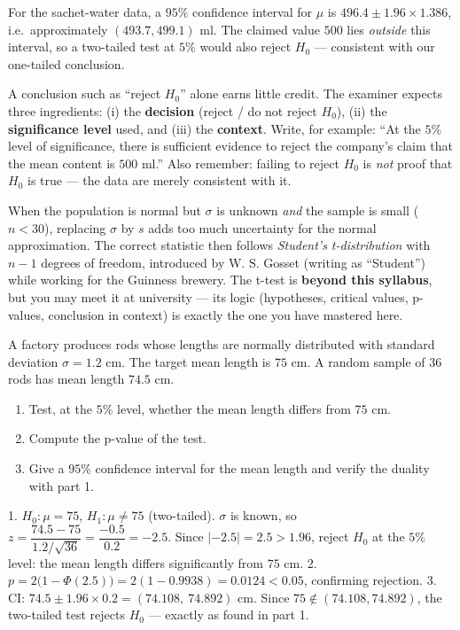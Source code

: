 \documentclass[11pt]{article}
\begin{document}
For the sachet-water data, a $95\%$ confidence interval for $\mu$ is $496.4 \pm 1.96 \times 1.386$, i.e.\ approximately $(493.7, 499.1)$ ml. The claimed value $500$ lies \emph{outside} this interval, so a two-tailed test at $5\%$ would also reject $H_0$ — consistent with our one-tailed conclusion.

\begin{attention}
A conclusion such as ``reject $H_0$'' alone earns little credit. The examiner expects three ingredients: (i) the \textbf{decision} (reject / do not reject $H_0$), (ii) the \textbf{significance level} used, and (iii) the \textbf{context}. Write, for example: ``At the $5\%$ level of significance, there is sufficient evidence to reject the company's claim that the mean content is $500$ ml.'' Also remember: failing to reject $H_0$ is \emph{not} proof that $H_0$ is true — the data are merely consistent with it.
\end{attention}

\begin{savaistu}
When the population is normal but $\sigma$ is unknown \emph{and} the sample is small ($n < 30$), replacing $\sigma$ by $s$ adds too much uncertainty for the normal approximation. The correct statistic then follows \emph{Student's t-distribution} with $n - 1$ degrees of freedom, introduced by W. S. Gosset (writing as ``Student'') while working for the Guinness brewery. The t-test is \textbf{beyond this syllabus}, but you may meet it at university — its logic (hypotheses, critical values, p-values, conclusion in context) is exactly the one you have mastered here.
\end{savaistu}

\begin{exercice}
A factory produces rods whose lengths are normally distributed with standard deviation $\sigma = 1.2$ cm. The target mean length is $75$ cm. A random sample of $36$ rods has mean length $74.5$ cm.
\begin{enumerate}
\item Test, at the $5\%$ level, whether the mean length differs from $75$ cm.
\item Compute the p-value of the test.
\item Give a $95\%$ confidence interval for the mean length and verify the duality with part 1.
\end{enumerate}
\end{exercice}

\begin{corrige}[Exercise 1]
1. $H_0 : \mu = 75$, $H_1 : \mu \neq 75$ (two-tailed). $\sigma$ is known, so $z = \dfrac{74.5 - 75}{1.2/\sqrt{36}} = \dfrac{-0.5}{0.2} = -2.5$. Since $|-2.5| = 2.5 > 1.96$, reject $H_0$ at the $5\%$ level: the mean length differs significantly from $75$ cm.
2. $p = 2\bigl(1 - \Phi(2.5)\bigr) = 2(1 - 0.9938) = 0.0124 < 0.05$, confirming rejection.
3. CI: $74.5 \pm 1.96 \times 0.2 = (74.108,\ 74.892)$ cm. Since $75 \notin (74.108, 74.892)$, the two-tailed test rejects $H_0$ — exactly as found in part 1.
\end{corrige}
\end{document}
